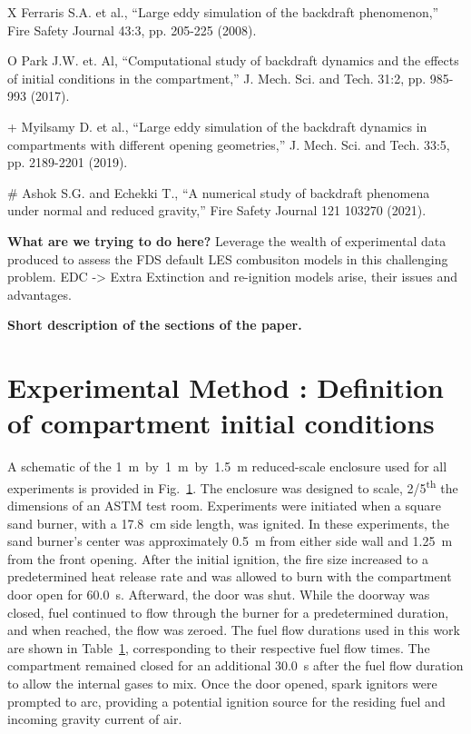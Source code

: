 \documentclass[12pt,letterpaper]{article}
\begin{document}
\begin{flushleft}
X Ferraris S.A. et al., “Large eddy simulation of the backdraft phenomenon,” Fire Safety Journal 43:3, pp. 205-225 (2008).

O Park J.W. et. Al, “Computational study of backdraft dynamics and the effects of initial conditions in the compartment,” J. Mech. Sci. and Tech. 31:2, pp. 985-993 (2017).

+ Myilsamy D. et al., “Large eddy simulation of the backdraft dynamics in compartments with different opening geometries,” J. Mech. Sci. and Tech. 33:5, pp. 2189-2201 (2019).

# Ashok S.G. and Echekki T., “A numerical study of backdraft phenomena under normal and reduced gravity,” Fire Safety Journal 121 103270 (2021).


\textbf{What are we trying to do here?} Leverage the wealth of experimental data produced to assess the FDS default LES combusiton models in this challenging problem.  EDC -> Extra Extinction and re-ignition models arise, their issues and advantages. 

\textbf{Short description of the sections of the paper.}

\section{Experimental Method : Definition of compartment initial conditions}
A schematic of the 1~m~by~1~m~by~1.5~m reduced-scale enclosure used for all experiments is provided in Fig.~\ref{}. The enclosure was designed to scale, 2/5\textsuperscript{th} the dimensions of an ASTM test room. Experiments were initiated when a square sand burner, with a 17.8~cm side length, was ignited. In these experiments, the sand burner's center was approximately 0.5~m from either side wall and 1.25~m from the front opening. After the initial ignition, the fire size increased to a predetermined heat release rate and was allowed to burn with the compartment door open for 60.0~s. Afterward, the door was shut. While the doorway was closed, fuel continued to flow through the burner for a predetermined duration, and when reached, the flow was zeroed. The fuel flow durations used in this work are shown in Table~\ref{}, corresponding to their respective fuel flow times. The compartment remained closed for an additional 30.0~s after the fuel flow duration to allow the internal gases to mix. Once the door opened, spark ignitors were prompted to arc, providing a potential ignition source for the residing fuel and incoming gravity current of air. 


\end{flushleft}
\end{document}
